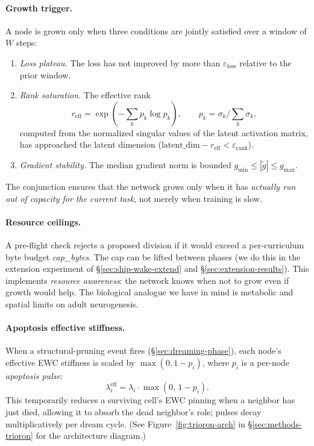 \documentclass[11pt]{article}
\newcommand{\reff}{r_{\text{eff}}}
\begin{document}
\paragraph{Growth trigger.}
A node is grown only when three conditions are jointly satisfied over a
window of $W$ steps:
\begin{enumerate}[leftmargin=2em]
  \item \emph{Loss plateau.} The loss has not improved by more than
        $\varepsilon_{\text{loss}}$ relative to the prior window.
  \item \emph{Rank saturation.} The effective rank
        \begin{equation*}
          \reff = \exp\!\left(-\sum_k p_k \log p_k\right),
          \qquad p_k = \sigma_k \big/ \textstyle\sum_k \sigma_k,
        \end{equation*}
        computed from the normalized singular values of the latent
        activation matrix, has approached the latent dimension
        ($\text{latent\_dim} - \reff < \varepsilon_{\text{rank}}$).
  \item \emph{Gradient stability.} The median gradient norm is bounded
        $g_{\min} \leq |\tilde g| \leq g_{\max}$.
\end{enumerate}
The conjunction ensures that the network grows only when it has
\emph{actually run out of capacity for the current task}, not merely
when training is slow.

\paragraph{Resource ceilings.}
A pre-flight check rejects a proposed division if it would exceed a
per-curriculum byte budget \textit{cap\_bytes}. The cap can be lifted
between phases (we do this in the extension experiment of
\S\ref{sec:ship-wake-extend} and \S\ref{sec:extension-results}). This
implements \emph{resource awareness}: the network knows when not to
grow even if growth would help. The biological analogue we have in mind
is metabolic and spatial limits on adult neurogenesis.

\paragraph{Apoptosis effective stiffness.}
When a structural-pruning event fires (\S\ref{sec:dreaming-phase}), each
node's effective EWC stiffness is scaled by $\max(0, 1 - p_i)$, where
$p_i$ is a per-node \emph{apoptosis pulse}:
\begin{equation}
  \lambda_i^{\text{eff}} = \lambda_i \cdot \max(0,\, 1 - p_i).
\end{equation}
This temporarily reduces a surviving cell's EWC pinning when a neighbor
has just died, allowing it to absorb the dead neighbor's role; pulses
decay multiplicatively per dream cycle. (See
Figure~\ref{fig:trioron-arch} in \S\ref{sec:methods-trioron} for the
architecture diagram.)
\end{document}

